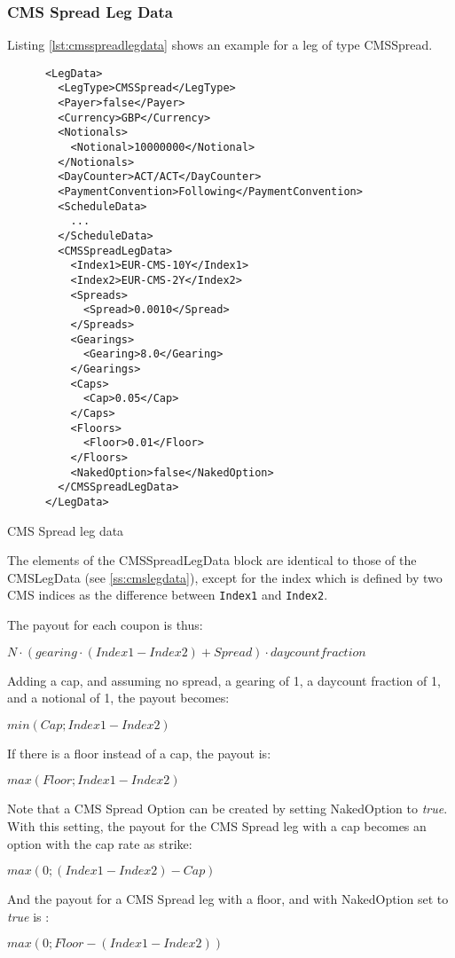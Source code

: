 \subsubsection{CMS Spread Leg Data}
\label{ss:cmsspreadlegdata}

Listing \ref{lst:cmsspreadlegdata} shows an example for a leg of type CMSSpread.

\begin{listing}[H]
\begin{verbatim}
      <LegData>
        <LegType>CMSSpread</LegType>
        <Payer>false</Payer>
        <Currency>GBP</Currency>
        <Notionals>
          <Notional>10000000</Notional>
        </Notionals>
        <DayCounter>ACT/ACT</DayCounter>
        <PaymentConvention>Following</PaymentConvention>
        <ScheduleData>
          ...
        </ScheduleData>
        <CMSSpreadLegData>
          <Index1>EUR-CMS-10Y</Index1>
          <Index2>EUR-CMS-2Y</Index2>
          <Spreads>
            <Spread>0.0010</Spread>
          </Spreads>
          <Gearings>
            <Gearing>8.0</Gearing>
          </Gearings>
          <Caps>
            <Cap>0.05</Cap>
          </Caps>
          <Floors>
            <Floor>0.01</Floor>
          </Floors>
          <NakedOption>false</NakedOption>  
        </CMSSpreadLegData>
      </LegData>
\end{verbatim}
\caption{CMS Spread leg data}
\label{lst:cmsspreadlegdata}
\end{listing}

The elements of the CMSSpreadLegData block are identical to those of the CMSLegData (see \ref{ss:cmslegdata}), except
for the index which is defined by two CMS indices as the difference between \verb+Index1+ and \verb+Index2+.

The payout for each coupon is thus:

$
N \cdot (gearing \cdot (Index1 - Index2) + Spread)  \cdot daycountfraction
$

Adding a cap, and assuming no spread,  a gearing of 1, a daycount fraction of 1, and a notional of 1, the payout becomes:

$
min (Cap; Index1 - Index2) 
$

If there is a floor instead of a cap, the payout is:

$
max (Floor; Index1 - Index2) 
$

Note that a CMS Spread Option can be created by setting NakedOption to \emph{true}. With this setting, the payout for the CMS Spread leg with a cap becomes an option with the cap rate as strike:

$
max (0; (Index1 - Index2) - Cap) 
$

And the payout for a CMS Spread leg with a floor, and with NakedOption set to \emph{true} is :

$
max (0; Floor - (Index1 - Index2))
$
